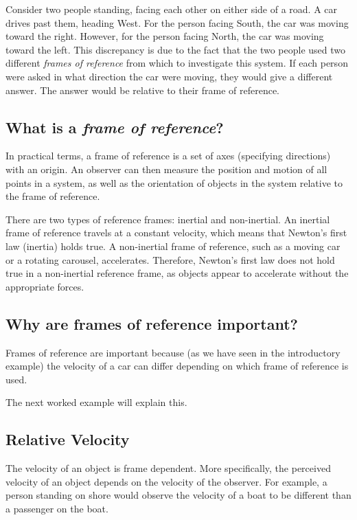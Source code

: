 Consider two people standing, facing each other on either side of a road. A car drives past them, heading West. For the person facing South, the car was moving toward the right. However, for the person facing North, the car was moving toward the left. This discrepancy is due to the fact that the two people used two different \textit{frames of reference} from which to investigate this system. If each person were asked in what direction the car were moving, they would give a different answer. The answer would be relative to their frame of reference.

\subsection{What is a \textit{frame of reference}?}
 In practical terms, a frame of reference is a set of axes (specifying directions) with an origin. An observer can then measure the position and motion of all points in a system, as well as the orientation of objects in the system relative to the frame of reference.

There are two types of reference frames: inertial and non-inertial. An inertial frame of reference travels at a constant velocity, which means that Newton's first law (inertia) holds true. A non-inertial frame of reference, such as a moving car or a rotating carousel, accelerates. Therefore, Newton's first law does not hold true in a non-inertial reference frame, as objects appear to accelerate without the appropriate forces.

\subsection{Why are frames of reference important?}
Frames of reference are important because (as we have seen in the introductory example) the velocity of a car can differ depending on which frame of reference is used.

The next worked example will explain this.
\subsection{Relative Velocity}
The velocity of an object is frame dependent. More specifically, the perceived velocity of an object depends on the velocity of the observer. For example, a person standing on shore would observe the velocity of a boat to be different than a passenger on the boat. 


